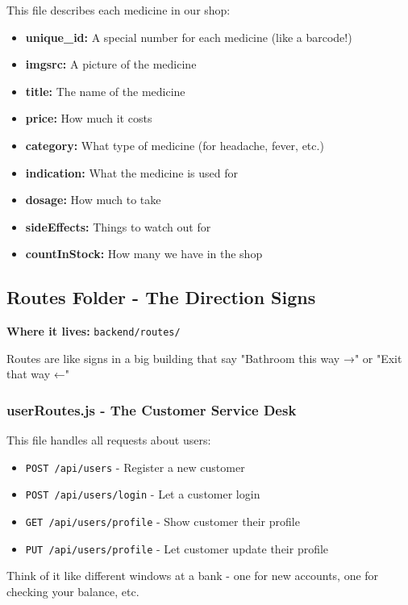 \documentclass[12pt]{article}
\begin{document}
This file describes each medicine in our shop:
\begin{itemize}
    \item \textbf{unique\_id:} A special number for each medicine (like a barcode!)
    \item \textbf{imgsrc:} A picture of the medicine
    \item \textbf{title:} The name of the medicine
    \item \textbf{price:} How much it costs
    \item \textbf{category:} What type of medicine (for headache, fever, etc.)
    \item \textbf{indication:} What the medicine is used for
    \item \textbf{dosage:} How much to take
    \item \textbf{sideEffects:} Things to watch out for
    \item \textbf{countInStock:} How many we have in the shop
\end{itemize}

\subsection{Routes Folder - The Direction Signs}

\textbf{Where it lives:} \texttt{backend/routes/}

Routes are like signs in a big building that say "Bathroom this way →" or "Exit that way ←"

\subsubsection{userRoutes.js - The Customer Service Desk}

This file handles all requests about users:
\begin{itemize}
    \item \texttt{POST /api/users} - Register a new customer
    \item \texttt{POST /api/users/login} - Let a customer login
    \item \texttt{GET /api/users/profile} - Show customer their profile
    \item \texttt{PUT /api/users/profile} - Let customer update their profile
\end{itemize}

Think of it like different windows at a bank - one for new accounts, one for checking your balance, etc.
\end{document}
